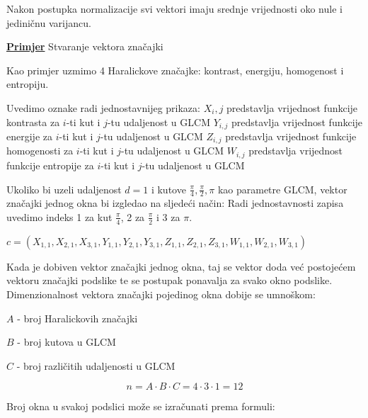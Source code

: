 \documentclass[times, utf8, zavrsni]{fer}
\begin{document}
Nakon postupka normalizacije svi vektori imaju srednje vrijednosti oko nule
i jediničnu varijancu. 

\bigbreak
\underline{\textbf{Primjer}} Stvaranje vektora značajki
\bigbreak

Kao primjer uzmimo 4 Haralickove značajke: kontrast, energiju, homogenost i entropiju. 

\bigbreak

Uvedimo oznake radi jednostavnijeg prikaza: 
\newline \(X_i,j\) predstavlja vrijednost funkcije kontrasta za \(i\)-ti
kut i \(j\)-tu udaljenost u GLCM
\newline \(Y_{i,j}\) predstavlja vrijednost funkcije energije za \(i\)-ti
kut i \(j\)-tu udaljenost u GLCM
\newline \(Z_{i,j}\) predstavlja vrijednost funkcije homogenosti za \(i\)-ti
kut i \(j\)-tu udaljenost u GLCM
\newline \(W_{i,j}\) predstavlja vrijednost funkcije entropije za \(i\)-ti
kut i \(j\)-tu udaljenost u GLCM

\bigbreak

Ukoliko bi uzeli udaljenost \(d=1\) i kutove \(\frac{\pi}{4}, \frac{\pi}{2}, \pi\)
kao parametre GLCM, vektor značajki jednog okna bi izgledao na sljedeći način:
\bigbreak
Radi jednostavnosti zapisa uvedimo indeks 1 za kut \(\frac{\pi}{4}\), 2 za
\(\frac{\pi}{2}\) i 3 za \(\pi\).

\bigbreak

\(
c = \left(X_{1,1}, X_{2,1}, X_{3,1}, Y_{1,1}, Y_{2,1}, Y_{3,1}, Z_{1,1}, 
Z_{2,1}, Z_{3,1}, W_{1,1}, W_{2,1}, W_{3,1}\right)
\)

\bigbreak

Kada je dobiven vektor značajki jednog okna, taj se vektor doda već postojećem 
vektoru značajki podslike te se postupak ponavalja za svako okno podslike.
\newline
Dimenzionalnost vektora značajki pojedinog okna dobije se umnoškom:

\begin{center}

\(A\) - broj Haralickovih značajki

\(B\) - broj kutova u GLCM

\(C\) - broj različitih udaljenosti u GLCM

\end{center}
\[
n = A \cdot B \cdot C = 4 \cdot 3 \cdot 1 = 12
\]

Broj okna u svakoj podslici može se izračunati prema formuli:
\end{document}
